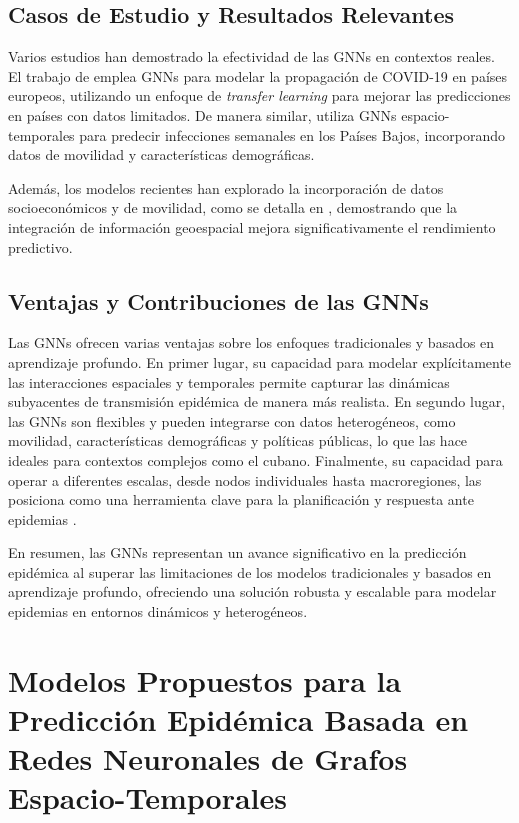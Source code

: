 \subsection{Casos de Estudio y Resultados Relevantes}

Varios estudios han demostrado la efectividad de las GNNs en contextos reales. El trabajo de \cite{142} emplea GNNs para modelar la propagación de COVID-19 en países europeos, utilizando un enfoque de \textit{transfer learning} para mejorar las predicciones en países con datos limitados. De manera similar, \cite{144} utiliza GNNs espacio-temporales para predecir infecciones semanales en los Países Bajos, incorporando datos de movilidad y características demográficas.

Además, los modelos recientes han explorado la incorporación de datos socioeconómicos y de movilidad, como se detalla en \cite{143}, demostrando que la integración de información geoespacial mejora significativamente el rendimiento predictivo.

\subsection{Ventajas y Contribuciones de las GNNs}

Las GNNs ofrecen varias ventajas sobre los enfoques tradicionales y basados en aprendizaje profundo. En primer lugar, su capacidad para modelar explícitamente las interacciones espaciales y temporales permite capturar las dinámicas subyacentes de transmisión epidémica de manera más realista. En segundo lugar, las GNNs son flexibles y pueden integrarse con datos heterogéneos, como movilidad, características demográficas y políticas públicas, lo que las hace ideales para contextos complejos como el cubano. Finalmente, su capacidad para operar a diferentes escalas, desde nodos individuales hasta macroregiones, las posiciona como una herramienta clave para la planificación y respuesta ante epidemias \cite{145,146}.

En resumen, las GNNs representan un avance significativo en la predicción epidémica al superar las limitaciones de los modelos tradicionales y basados en aprendizaje profundo, ofreciendo una solución robusta y escalable para modelar epidemias en entornos dinámicos y heterogéneos.

\section{Modelos Propuestos para la Predicción Epidémica Basada en Redes Neuronales de Grafos Espacio-Temporales}\label{section:proposed-models}

